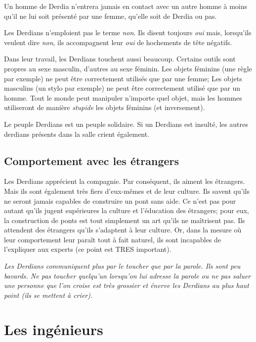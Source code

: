 \documentclass[11pt,a4paper]{article}
\begin{document}
{Un homme de Derdia n'entrera jamais en contact avec un autre homme à moins qu'il ne lui soit présenté par une femme, qu'elle soit de Derdia ou pas.

Les Derdians n'emploient pas le terme \emph{non}. Ils disent toujours \emph{oui} mais, lorsqu'ils veulent dire \emph{non}, ils accompagnent leur \emph{oui} de hochements de tête négatifs.

Dans leur travail, les Derdians touchent aussi beaucoup.
Certains outils sont propres au sexe masculin, d'autres au sexe féminin.
Les objets féminins (une règle par exemple) ne peut être correctement utilisés que par une femme; Les objets masculins (un stylo par exemple) ne peut être correctement utilisé que par un homme.
Tout le monde peut manipuler n'importe quel objet, mais les hommes utiliseront de manière \emph{stupide} les objets féminins (et inversement).

Le peuple Derdians est un peuple solidaire. Si un Derdians est insulté, les autres derdians présents dans la salle crient également.
 
 \subsection{Comportement avec les étrangers}
 
 Les Derdians apprécient la compagnie.
 Par conséquent, ils aiment les étrangers.
 Mais ils sont également très fiers d'eux-mêmes et de leur culture.
 Ils savent qu'ils ne seront jamais capables de construire un pont sans aide.
 Ce n'est pas pour autant qu'ils jugent supérieures la culture et l'éducation des étrangers; pour eux, la construction de ponts est tout simplement un art qu'ils ne maîtrisent pas.
 Ils attendent des étrangers qu'ils s'adaptent à leur culture.
 Or, dans la mesure où leur comportement leur paraît tout à fait naturel, ils sont incapables de l'expliquer aux experts (ce point est TRES important).

 \emph{Les Derdians communiquent plus par le toucher que par la parole. Ils sont peu bavards. Ne pas toucher quelqu'un lorsqu'on lui adresse la parole ou ne pas saluer une personne que l'on croise est très grossier et énerve les Derdians au plus haut point (ils se mettent à crier).}

\pagebreak
}
 
\section{Les ingénieurs}
\end{document}
